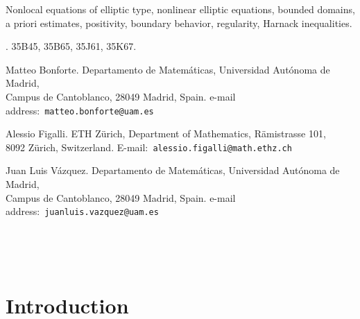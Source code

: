 \documentclass[11pt]{article}
\numberwithin{equation}{section}
\begin{document}
  Nonlocal equations of elliptic type, nonlinear elliptic equations, bounded domains, a priori estimates, positivity, boundary behavior, regularity, Harnack inequalities.


. 35B45, 35B65,
35J61, 35K67.

\vfill
\small
{}

\noindent Matteo Bonforte. Departamento de Matem\'{a}ticas, Universidad
Aut\'{o}noma de Madrid,\\ Campus de Cantoblanco, 28049 Madrid, Spain.
e-mail address:~\texttt{matteo.bonforte@uam.es}

\noindent Alessio Figalli. ETH Z\"urich, Department of Mathematics,
R\"amistrasse 101,\\ 8092 Z\"urich, Switzerland.
E-mail:\texttt{~alessio.figalli@math.ethz.ch}

\noindent Juan Luis V\'azquez. Departamento de Matem\'{a}ticas, Universidad
Aut\'{o}noma de Madrid,\\ Campus de Cantoblanco, 28049 Madrid, Spain.  e-mail address:~\texttt{juanluis.vazquez@uam.es}

\

\

\normalsize

\section{Introduction}
\end{document}
